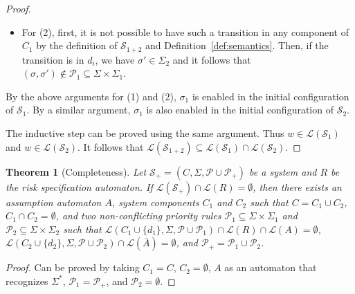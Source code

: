 \documentclass[10pt, a4paper, onecolumn, conference, compsocconf]{IEEEtran}
\newtheorem{theo}{Theorem}
\begin{document}
\begin{proof}
\begin{itemize}
  \item For (2), first, it is not possible to have such a transition in any component of
        $C_1$ by the definition of $\mathcal{S}_{1+2}$ and Definition~\ref{def:semantics}. Then, if the transition is in $d_i$, we have $\sigma' \in \Sigma_2$ and it follows that $(\sigma,\sigma') \notin \mathcal{P}_1\subseteq \Sigma\times\Sigma_1$.
\end{itemize}

By the above arguments for (1) and (2), $\sigma_1$ is enabled in the initial configuration of $\mathcal{S}_{1}$. By a similar argument, $\sigma_1$ is also enabled in the initial configuration of $\mathcal{S}_{2}$.

The inductive step can be proved using the same argument. Thus $w \in \mathcal{L}(\mathcal{S}_{1})$ and $w \in \mathcal{L}(\mathcal{S}_{2})$.
It follows that $\mathcal{L}(\mathcal{S}_{1+2})\subseteq \mathcal{L}(\mathcal{S}_{1})\cap \mathcal{L}(\mathcal{S}_{2})$.
\end{proof}

\begin{theo}[Completeness]\label{the:ag-complete}
Let $\mathcal{S}_{+} = (C , \Sigma, \mathcal{P}\cup \mathcal{P}_{+})$ be a system and $R$ be the risk specification automaton. If $\mathcal{L}(\mathcal{S}_{+})\cap \mathcal{L}(R) = \emptyset$, then there exists an assumption automaton $A$, system components $C_1$ and $C_2$ such that $C=C_1\cup C_2$, $C_1\cap C_2 =\emptyset$, and two non-conflicting priority rules $\mathcal{P}_{1}\subseteq \Sigma \times \Sigma_1$ and $\mathcal{P}_{2}\subseteq \Sigma \times \Sigma_2$ such that $\mathcal{L}(C_1 \cup \{d_1\}, \Sigma, \mathcal{P}\cup \mathcal{P}_1)\cap \mathcal{L}(R) \cap \mathcal{L}(A)=\emptyset$,  $\mathcal{L}(C_2 \cup \{d_2\}, \Sigma, \mathcal{P}\cup \mathcal{P}_2)\cap \mathcal{L}(\overline{A})=\emptyset$, and $\mathcal{P}_{+}=\mathcal{P}_{1} \cup \mathcal{P}_{2}$.
\end{theo}
\begin{proof}
Can be proved by taking $C_1=C$, $C_2=\emptyset$, $A$ as an automaton that recognizes $\Sigma^*$, $\mathcal{P}_{1}=\mathcal{P}_{+}$, and $\mathcal{P}_{2}=\emptyset$.
\end{proof}
\end{document}
